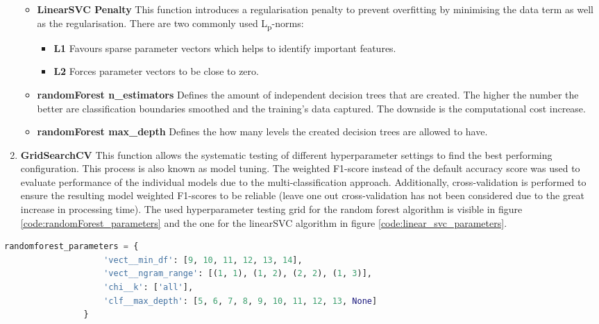 \begin{enumerate}
\begin{itemize}[label={}]
        \item \textbf{LinearSVC Penalty} This function introduces a regularisation penalty to prevent overfitting by minimising the data term as well as the regularisation. There are two commonly used L\textsubscript{p}-norms:
        \begin{itemize}
            \item \textbf{L1} Favours sparse parameter vectors which helps to identify important features.
            \item \textbf{L2} Forces parameter vectors to be close to zero.
        \end{itemize}
        
        \item \textbf{randomForest n\_estimators} Defines the amount of independent decision trees that are created. The higher the number the better are classification boundaries smoothed and the training's data captured. The downside is the computational cost increase.
        
        \item \textbf{randomForest max\_depth} Defines the how many levels the created decision trees are allowed to have.
    \end{itemize}
    
    \item \textbf{GridSearchCV} This function allows the systematic testing of different hyperparameter settings to find the best performing configuration. This process is also known as model tuning. The weighted F1-score instead of the default accuracy score was used to evaluate performance of the individual models due to the multi-classification approach. Additionally, cross-validation is performed to ensure the resulting model weighted F1-scores to be reliable (leave one out cross-validation has not been considered due to the great increase in processing time). The used hyperparameter testing grid for the random forest algorithm is visible in figure \ref{code:randomForest_parameters} and the one for the linearSVC algorithm in figure \ref{code:linear_svc_parameters}.
\end{enumerate}

\begin{lstlisting}[language=Python, caption=Tuned hyperparameters of the randomForest fitting algorithm, label=code:randomForest_parameters]
randomforest_parameters = {
                    'vect__min_df': [9, 10, 11, 12, 13, 14],
                    'vect__ngram_range': [(1, 1), (1, 2), (2, 2), (1, 3)],
                    'chi__k': ['all'],
                    'clf__max_depth': [5, 6, 7, 8, 9, 10, 11, 12, 13, None]
                }
\end{lstlisting}

